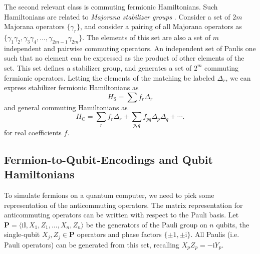 \documentclass[%
 aip,
 amsmath,amssymb,
 reprint,%
]{revtex4-1}
\newcommand{\stabilizerHamiltonian}{H_{\mathrm{S}}}
\newcommand{\commutingHamiltonian}{H_{\mathrm{C}}}
\newcommand{\Id}{\mathbb{I}}       %
\newcommand{\coeff}{f}
\begin{document}
The second relevant class is commuting fermionic Hamiltonians. Such Hamiltonians are related to {\it Majorana stabilizer groups} \cite{Bravyi_MajoranaCodes, Mudassar_2024}. Consider a set of $2m$ Majorana operators $\{\gamma_r\}$, and consider a pairing of all Majorana operators as $\{\gamma_1 \gamma_2, \gamma_3 \gamma_4, ..., \gamma_{2m-1}\gamma_{2m} \}$. The elements of this set are also %
a set of $m$ independent and pairwise commuting operators. An independent set of Paulis one such that no element can be expressed as the product of other elements of the set. This set defines a stabilizer group, and generates a set of $2^m$ commuting fermionic operators. Letting the elements of the matching be labeled $\Delta_r$, we can express %
stabilizer fermionic Hamiltonians as 
\begin{equation}
    \stabilizerHamiltonian = \sum \coeff_r \Delta_r
    \label{eq:stabilizer-fermionic-hamiltonian}
\end{equation}
and general commuting Hamiltonians as 
\begin{equation}
    \commutingHamiltonian = \sum_r \coeff_r \Delta_r + \sum_{p,q} \coeff_{pq} \Delta_p \Delta_q + \cdots .
    \label{eq:commuting-fermionic-hamiltonian}
\end{equation}
for real coefficients $f$. 


\subsection{Fermion-to-Qubit-Encodings and Qubit Hamiltonians}
\label{sec:fermion-to-qubit-encodings}
\indent To simulate fermions on a quantum computer, we need to pick some representation of the anticommuting operators. The matrix representation for anticommuting operators can be written with respect to the Pauli basis. Let $\mathbf{P} = \langle \mathrm{i}\Id, X_1, Z_1, ..., X_n, Z_n\rangle$ be the generators of the Pauli group on $n$ qubits, the single-qubit $X_j, Z_j \in \mathbf{P}$ operators and phase factors $\{\pm 1, \pm \mathrm{i} \}$. All Paulis (i.e. Pauli operators) can be generated from this set, recalling $X_p Z_p =\mathrm{-i}Y_p$. \\ 
\end{document}
